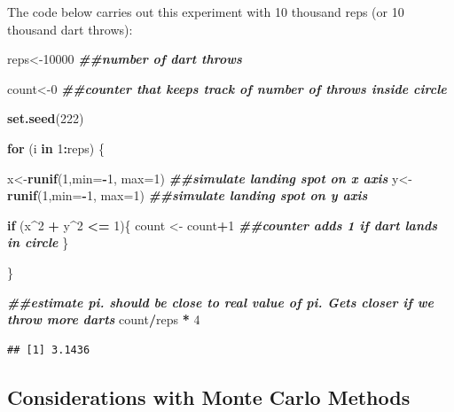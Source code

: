 \documentclass[
]{book}
\newenvironment{Shaded}{\begin{snugshade}}{\end{snugshade}}
\newcommand{\AttributeTok}[1]{\textcolor[rgb]{0.13,0.29,0.53}{#1}}
\newcommand{\ControlFlowTok}[1]{\textcolor[rgb]{0.13,0.29,0.53}{\textbf{#1}}}
\newcommand{\DecValTok}[1]{\textcolor[rgb]{0.00,0.00,0.81}{#1}}
\newcommand{\DocumentationTok}[1]{\textcolor[rgb]{0.56,0.35,0.01}{\textbf{\textit{#1}}}}
\newcommand{\FunctionTok}[1]{\textcolor[rgb]{0.13,0.29,0.53}{\textbf{#1}}}
\newcommand{\NormalTok}[1]{#1}
\newcommand{\OtherTok}[1]{\textcolor[rgb]{0.56,0.35,0.01}{#1}}
\newcommand{\SpecialCharTok}[1]{\textcolor[rgb]{0.81,0.36,0.00}{\textbf{#1}}}
\begin{document}
The code below carries out this experiment with 10 thousand reps (or 10 thousand dart throws):

\begin{Shaded}
\begin{Highlighting}[]
\NormalTok{reps}\OtherTok{\textless{}{-}}\DecValTok{10000} \DocumentationTok{\#\#number of dart throws}

\NormalTok{count}\OtherTok{\textless{}{-}}\DecValTok{0} \DocumentationTok{\#\#counter that keeps track of number of throws inside circle}

\FunctionTok{set.seed}\NormalTok{(}\DecValTok{222}\NormalTok{)}

\ControlFlowTok{for}\NormalTok{ (i }\ControlFlowTok{in} \DecValTok{1}\SpecialCharTok{:}\NormalTok{reps) \{}

\NormalTok{x}\OtherTok{\textless{}{-}}\FunctionTok{runif}\NormalTok{(}\DecValTok{1}\NormalTok{,}\AttributeTok{min=}\SpecialCharTok{{-}}\DecValTok{1}\NormalTok{, }\AttributeTok{max=}\DecValTok{1}\NormalTok{) }\DocumentationTok{\#\#simulate landing spot on x axis}
\NormalTok{y}\OtherTok{\textless{}{-}}\FunctionTok{runif}\NormalTok{(}\DecValTok{1}\NormalTok{,}\AttributeTok{min=}\SpecialCharTok{{-}}\DecValTok{1}\NormalTok{, }\AttributeTok{max=}\DecValTok{1}\NormalTok{) }\DocumentationTok{\#\#simulate landing spot on y axis}

  \ControlFlowTok{if}\NormalTok{ (x}\SpecialCharTok{\^{}}\DecValTok{2} \SpecialCharTok{+}\NormalTok{ y}\SpecialCharTok{\^{}}\DecValTok{2} \SpecialCharTok{\textless{}=} \DecValTok{1}\NormalTok{)\{}
\NormalTok{    count }\OtherTok{\textless{}{-}}\NormalTok{ count}\SpecialCharTok{+}\DecValTok{1} \DocumentationTok{\#\#counter adds 1 if dart lands in circle}
\NormalTok{  \}}

\NormalTok{\}}

\DocumentationTok{\#\#estimate pi. should be close to real value of pi. Gets closer if we throw more darts}
\NormalTok{count}\SpecialCharTok{/}\NormalTok{reps }\SpecialCharTok{*} \DecValTok{4} 
\end{Highlighting}
\end{Shaded}

\begin{verbatim}
## [1] 3.1436
\end{verbatim}

\subsection{Considerations with Monte Carlo Methods}\label{considerations-with-monte-carlo-methods}
\end{document}
